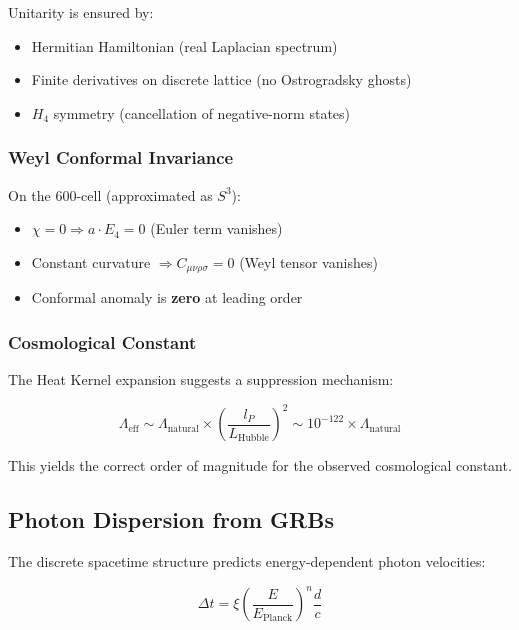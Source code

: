 \documentclass[12pt,a4paper]{article}
\begin{document}
Unitarity is ensured by:
\begin{itemize}
    \item Hermitian Hamiltonian (real Laplacian spectrum)
    \item Finite derivatives on discrete lattice (no Ostrogradsky ghosts)
    \item $H_4$ symmetry (cancellation of negative-norm states)
\end{itemize}

\subsubsection{Weyl Conformal Invariance}

On the 600-cell (approximated as $S^3$):
\begin{itemize}
    \item $\chi = 0 \Rightarrow a \cdot E_4 = 0$ (Euler term vanishes)
    \item Constant curvature $\Rightarrow C_{\mu\nu\rho\sigma} = 0$ (Weyl tensor vanishes)
    \item Conformal anomaly is \textbf{zero} at leading order
\end{itemize}

\subsubsection{Cosmological Constant}

The Heat Kernel expansion suggests a suppression mechanism:

\begin{equation}
\Lambda_{\text{eff}} \sim \Lambda_{\text{natural}} \times \left(\frac{l_P}{L_{\text{Hubble}}}\right)^2 \sim 10^{-122} \times \Lambda_{\text{natural}}
\end{equation}

This yields the correct order of magnitude for the observed cosmological constant.



\subsection{Photon Dispersion from GRBs}

The discrete spacetime structure predicts energy-dependent photon velocities:

\begin{equation}
\Delta t = \xi \left(\frac{E}{E_{\text{Planck}}}\right)^n \frac{d}{c}
\end{equation}
\end{document}
